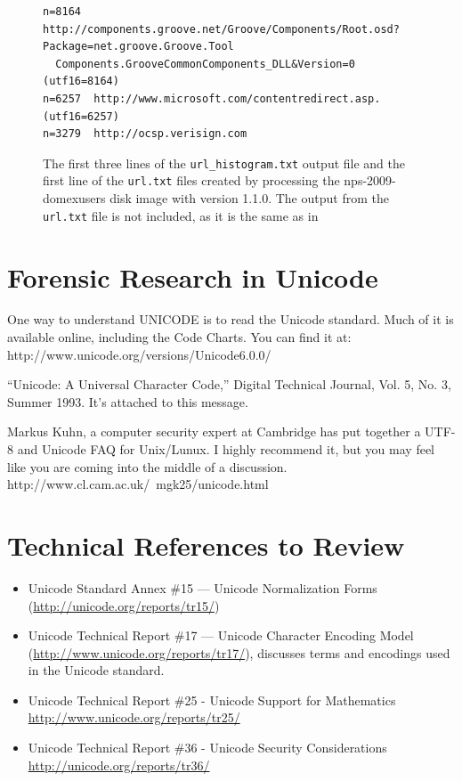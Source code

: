 \begin{figure}
\begin{Verbatim}
n=8164	http://components.groove.net/Groove/Components/Root.osd?Package=net.groove.Groove.Tool
  Components.GrooveCommonComponents_DLL&Version=0	(utf16=8164)
n=6257	http://www.microsoft.com/contentredirect.asp.	(utf16=6257)
n=3279	http://ocsp.verisign.com
\end{Verbatim}
\caption{The first three lines of the \texttt{url\_histogram.txt}
  output file and the first line of the \texttt{url.txt} files created
  by processing the
  nps-2009-domexusers disk image with \be version 1.1.0. The output from the \texttt{url.txt}
file is not included, as it is the same as in }\label{url_histogram-1.1.0}
\end{figure}

\section{Forensic Research in Unicode}

One way to understand UNICODE is to read the Unicode standard. Much of
it is available online, including the Code Charts. You can find it at:
http://www.unicode.org/versions/Unicode6.0.0/

``Unicode: A Universal Character Code,'' Digital Technical Journal,
Vol. 5, No. 3, Summer 1993. It's attached to this message.

Markus Kuhn, a computer security expert at Cambridge has put together
a UTF-8 and Unicode FAQ for Unix/Lunux. I highly recommend it, but you
may feel like you are coming into the middle of a discussion.
http://www.cl.cam.ac.uk/~mgk25/unicode.html



\section{Technical References to Review}
\begin{itemize}
\item Unicode Standard Annex \#15 --- Unicode Normalization Forms (\url{http://unicode.org/reports/tr15/})
\item Unicode Technical Report \#17 --- Unicode Character Encoding Model (\url{http://www.unicode.org/reports/tr17/}), discusses terms and encodings used in the Unicode standard.
\item Unicode Technical Report \#25 - Unicode Support for Mathematics \url{http://www.unicode.org/reports/tr25/}
\item Unicode Technical Report \#36 - Unicode Security Considerations \url{http://unicode.org/reports/tr36/}

\end{itemize}



